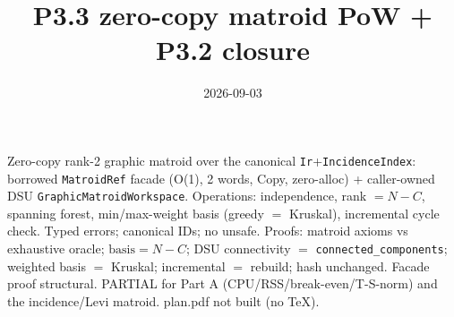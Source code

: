 \documentclass[11pt]{article}\usepackage[margin=1in]{geometry}
\title{P3.3 zero-copy matroid PoW + P3.2 closure}\date{2026-09-03}
\begin{document}
\maketitle
Zero-copy rank-2 graphic matroid over the canonical \texttt{Ir}+\texttt{IncidenceIndex}:
borrowed \texttt{MatroidRef} facade (O(1), 2 words, Copy, zero-alloc) + caller-owned DSU
\texttt{GraphicMatroidWorkspace}. Operations: independence, rank $=N-C$, spanning forest,
min/max-weight basis (greedy $=$ Kruskal), incremental cycle check. Typed errors; canonical IDs;
no unsafe. Proofs: matroid axioms vs exhaustive oracle; $\text{basis}=N-C$; DSU connectivity $=$
\texttt{connected\_components}; weighted basis $=$ Kruskal; incremental $=$ rebuild; hash unchanged.
Facade proof structural. PARTIAL for Part A (CPU/RSS/break-even/T-S-norm) and the incidence/Levi
matroid. plan.pdf not built (no TeX).
\end{document}
